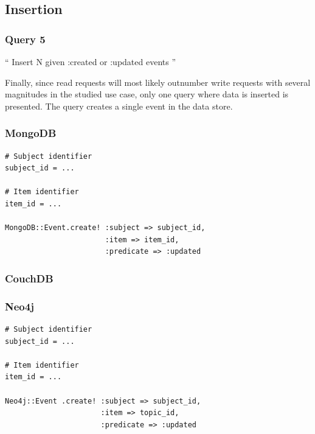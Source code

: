\subsection{Insertion}
\label{subsec:insertion}

\subsubsection{Query 5}
\label{subsubsec:query-5}

``
Insert N given :created or :updated events
''

Finally, since read requests will most likely outnumber write requests with several magnitudes in the studied use case, only one query where data is inserted is presented.
The query creates a single event in the data store.

\subsubsection*{MongoDB}

\begin{verbatim}
# Subject identifier
subject_id = ...

# Item identifier
item_id = ...

MongoDB::Event.create! :subject => subject_id,
                       :item => item_id,
                       :predicate => :updated
\end{verbatim}

\subsubsection*{CouchDB}


\subsubsection*{Neo4j}

\begin{verbatim}
# Subject identifier
subject_id = ...

# Item identifier
item_id = ...

Neo4j::Event .create! :subject => subject_id,
                      :item => topic_id,
                      :predicate => :updated
\end{verbatim}

